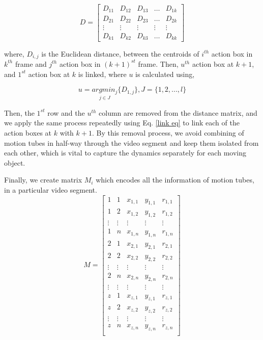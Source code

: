 \begin{equation}
D=\begin{bmatrix}
    D_{11}       & D_{12} & D_{13} & \dots & D_{1k} \\
    D_{21}       & D_{22} & D_{23} & \dots & D_{2k} \\
    \vdots       & \vdots & \vdots & \vdots & \vdots \\
    D_{k1}       & D_{k2} & D_{k3} & \dots & D_{kk}
\end{bmatrix}
\end{equation}


where, $D_{i,j}$ is the Euclidean distance, between the centroids of $i^{th}$ action box in $k^{th}$ frame and $j^{th}$ action box in $(k+1)^{st}$ frame.
Then, $u^{th}$ action box at $k+1$, and $1^{st}$ action box at $k$ is linked, where $u$ is calculated using,


\begin{equation}
u=\underset{j\in J}{argmin_j}\{D_{1,j}\}, J=\{1,2,...,l\}
\label{link eq}
\end{equation}

Then, the $1^{st}$ row and the $u^{th}$ column are removed from the distance matrix, and we apply the same process repeatedly using Eq. \ref{link eq}
to link each of the action boxes at $k$ with $k+1$. By this removal process, we avoid combining of motion tubes in half-way through
the video segment and keep them isolated from each other, which is vital to capture the dynamics separately for each moving object.




Finally, we create matrix $M_{i}$ which encodes all the information of motion tubes, in a particular video segment.
\begin{equation}
M=\begin{bmatrix}
    1       & 1 & x_{1,1} & y_{1,1} & r_{1,1} \\
    1       & 2 & x_{1,2} & y_{1,2} & r_{1,2} \\
    \vdots       & \vdots & \vdots & \vdots & \vdots \\
    1       & n & x_{1,n} & y_{1,n} & r_{1,n} \\
    2       & 1 & x_{2,1} & y_{2,1} & r_{2,1} \\
    2       & 2 & x_{2,2} & y_{2,2} & r_{2,2} \\
    \vdots       & \vdots & \vdots & \vdots & \vdots \\
    2       & n & x_{2,n} & y_{2,n} & r_{2,n} \\
    \vdots       & \vdots & \vdots & \vdots & \vdots \\
    z       & 1 & x_{z,1} & y_{z,1} & r_{z,1} \\
    z       & 2 & x_{z,2} & y_{z,2} & r_{z,2} \\
    \vdots       & \vdots & \vdots & \vdots & \vdots \\
    z       & n & x_{z,n} & y_{z,n} & r_{z,n} \\

\end{bmatrix}
\end{equation}

